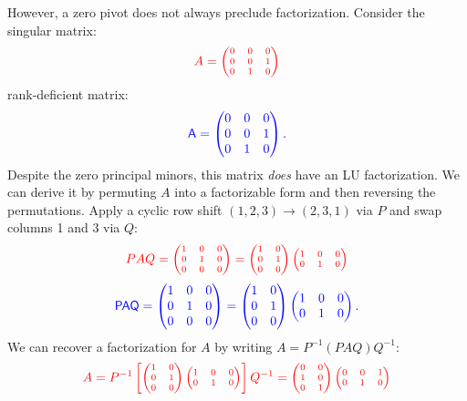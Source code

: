 \documentclass[10pt,twoside]{siamart1116}
\numberwithin{theorem}{section}
\providecommand{\DIFadd}[1]{{\protect\color{blue} \sf #1}} %
\providecommand{\DIFdel}[1]{{\protect\color{red} \scriptsize #1}} %
\providecommand{\DIFaddbegin}{} %
\providecommand{\DIFaddend}{} %
\providecommand{\DIFdelbegin}{} %
\providecommand{\DIFdelend}{} %
\begin{document}
However, a zero pivot does not always preclude factorization. Consider the \DIFdelbegin \DIFdel{singular matrix:
}\[
	\DIFdel{A = \begin{pmatrix} 0 & 0 & 0 \\ 0 & 0 & 1 \\ 0 & 1 & 0 \end{pmatrix}
}\]%
\DIFdelend \DIFaddbegin \DIFadd{rank-deficient matrix:
}\[
  \DIFadd{A =
  \begin{pmatrix} 0 & 0 & 0 \\ 0 & 0 & 1 \\ 0 & 1 & 0
  \end{pmatrix}.
}\]\DIFaddend 
Despite the zero principal minors, this matrix \emph{does} have an LU factorization. We can derive it by permuting $A$ into a factorizable form and then reversing the permutations. Apply a cyclic row shift $(1,2,3) \to (2,3,1)$ via $P$ and swap columns 1 and 3 via $Q$:
\DIFdelbegin \[
	\DIFdel{PAQ = \begin{pmatrix} 1 & 0 & 0 \\ 0 & 1 & 0 \\ 0 & 0 & 0 \end{pmatrix}
	= \begin{pmatrix} 1 & 0 \\ 0 & 1 \\ 0 & 0 \end{pmatrix}
	\begin{pmatrix} 1 & 0 & 0 \\ 0 & 1 & 0 \end{pmatrix}
}\]%
\DIFdelend \DIFaddbegin \[
  \DIFadd{PAQ =
  \begin{pmatrix} 1 & 0 & 0 \\ 0 & 1 & 0 \\ 0 & 0 & 0
  \end{pmatrix}
  =
  \begin{pmatrix} 1 & 0 \\ 0 & 1 \\ 0 & 0
  \end{pmatrix}
  \begin{pmatrix} 1 & 0 & 0 \\ 0 & 1 & 0
  \end{pmatrix}.
}\]\DIFaddend 
We can recover a factorization for $A$ by writing $A = P^{-1} (PAQ) Q^{-1}$:
\DIFdelbegin \[
	\DIFdel{A = P^{-1} \left[ \begin{pmatrix} 1 & 0 \\ 0 & 1 \\ 0 & 0 \end{pmatrix}
		\begin{pmatrix} 1 & 0 & 0 \\ 0 & 1 & 0 \end{pmatrix} \right] Q^{-1} =
	\begin{pmatrix} 0 & 0 \\ 1 & 0 \\ 0 & 1 \end{pmatrix}
	\begin{pmatrix} 0 & 0 & 1 \\ 0 & 1 & 0 \end{pmatrix}
}\]%
\end{document}
